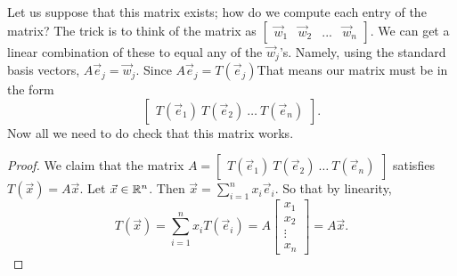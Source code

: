 Let us suppose that this matrix exists; how do we compute each entry of the matrix?
The trick is to think of the matrix as $\begin{bmatrix}
	\vec{w}_1 & \vec{w}_2 & ... & \vec{w}_n
\end{bmatrix}$.
We can get a linear combination of these to equal any of the $\vec{w}_j$'s. Namely, using the standard basis vectors,
$A\vec{e}_j=\vec{w}_j$. Since $A\vec{e}_j=T(\vec{e}_j)$That means our matrix must be in the form \[
	\begin{bmatrix}
		T(\vec{e}_1) \ T(\vec{e}_2) \ \ldots \ T(\vec{e}_n)
	\end{bmatrix} .
\]
Now all we need to do check that this matrix works.
\begin{proof}
	We claim that the matrix $A=\begin{bmatrix}
		T(\vec{e}_1) \ T(\vec{e}_2) \ \ldots \ T(\vec{e}_n)
	\end{bmatrix}$ satisfies $T(\vec{x})=A\vec{x}$.
	Let $\vec{x}\in \mathbb{R}^n$. Then $\vec{x}=\sum_{i=1}^{n} x_i\vec{e}_i$.
	So that by linearity, \[
	T(\vec{x}) = \sum_{i=1}^{n} x_i T(\vec{e}_i) = A \begin{bmatrix}
		x_1 \\ x_2 \\ \vdots \\ x_n
	\end{bmatrix} = A\vec{x}.
	\]
\end{proof}	
